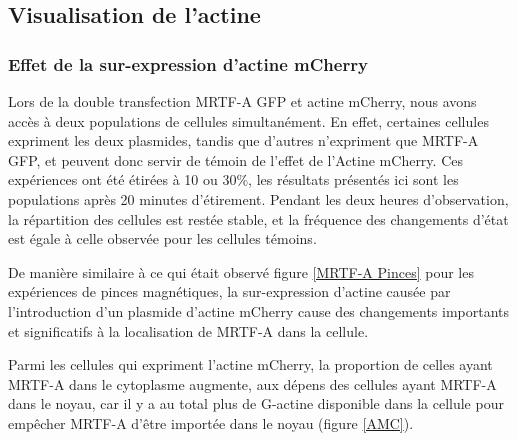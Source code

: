 \subsection{Visualisation de l'actine}
\subsubsection{Effet de la sur-expression d'actine mCherry}

Lors de la double transfection MRTF-A GFP et actine mCherry, nous avons accès à deux populations de cellules simultanément. En effet, certaines cellules expriment les deux plasmides, tandis que d'autres n'expriment que MRTF-A GFP, et peuvent donc servir de témoin de l'effet de l'Actine mCherry. 
Ces expériences ont été étirées à 10 ou 30\%, les résultats présentés ici sont les populations après 20 minutes d'étirement. Pendant les deux heures d'observation, la répartition des cellules est restée stable, et la fréquence des changements d'état est égale à celle observée pour les cellules témoins. 

De manière similaire à ce qui était observé figure \ref{MRTF-A Pinces} pour les expériences de pinces magnétiques, la sur-expression d'actine causée par l'introduction d'un plasmide d'actine mCherry cause des changements importants et significatifs à la localisation de MRTF-A dans la cellule. 

Parmi les cellules qui expriment l'actine mCherry, la proportion de celles ayant MRTF-A dans le cytoplasme augmente, aux dépens des cellules ayant MRTF-A dans le noyau, car il y a au total plus de G-actine disponible dans la cellule pour empêcher MRTF-A d'être importée dans le noyau (figure \ref{AMC}). 

